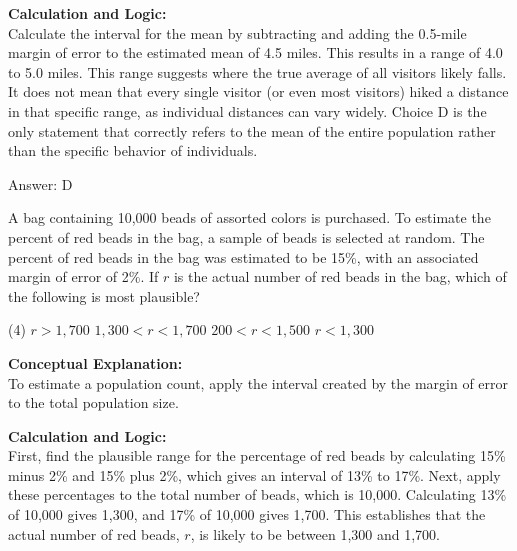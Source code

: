 \documentclass[11pt,paper=a4,answers]{exam}
\begin{document}
\begin{questions}
\begin{solution}
\textbf{Calculation and Logic:} \\
Calculate the interval for the mean by subtracting and adding the 0.5-mile margin of error to the estimated mean of 4.5 miles. This results in a range of 4.0 to 5.0 miles. This range suggests where the true average of all visitors likely falls. It does not mean that every single visitor (or even most visitors) hiked a distance in that specific range, as individual distances can vary widely. Choice D is the only statement that correctly refers to the mean of the entire population rather than the specific behavior of individuals.

\vspace{30pt}

Answer: \colorbox{yellow!100}{D}
\end{solution}

\vspace{60pt}

\question
A bag containing 10,000 beads of assorted colors is purchased. To estimate the percent of red beads in the bag, a sample of beads is selected at random. The percent of red beads in the bag was estimated to be 15\%, with an associated margin of error of 2\%. If $r$ is the actual number of red beads in the bag, which of the following is most plausible?
\begin{tasks}(4)
    \task $r > 1,700$
    \task $1,300 < r < 1,700$
    \task $200 < r < 1,500$
    \task $r < 1,300$
\end{tasks}

\begin{solution}
\textbf{Conceptual Explanation:} \\
To estimate a population count, apply the interval created by the margin of error to the total population size.

\vspace{30pt}

\textbf{Calculation and Logic:} \\
First, find the plausible range for the percentage of red beads by calculating 15\% minus 2\% and 15\% plus 2\%, which gives an interval of 13\% to 17\%. Next, apply these percentages to the total number of beads, which is 10,000. Calculating 13\% of 10,000 gives 1,300, and 17\% of 10,000 gives 1,700. This establishes that the actual number of red beads, $r$, is likely to be between 1,300 and 1,700.

\vspace{30pt}


\end{solution}
\end{questions}
\end{document}
